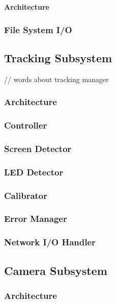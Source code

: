 \documentclass[11pt,a4paper,oldfontcommands]{memoir}
\begin{document}
\textbf{Architecture}

\subsubsection{File System I/O}

\newpage

\subsection{Tracking Subsystem}

// words about tracking manager

\subsubsection{Architecture}

\subsubsection{Controller}

\subsubsection{Screen Detector}

\subsubsection{LED Detector}

\subsubsection{Calibrator}

\subsubsection{Error Manager}

\subsubsection{Network I/O Handler}

\newpage

\subsection{Camera Subsystem}

\subsubsection{Architecture}
\end{document}
